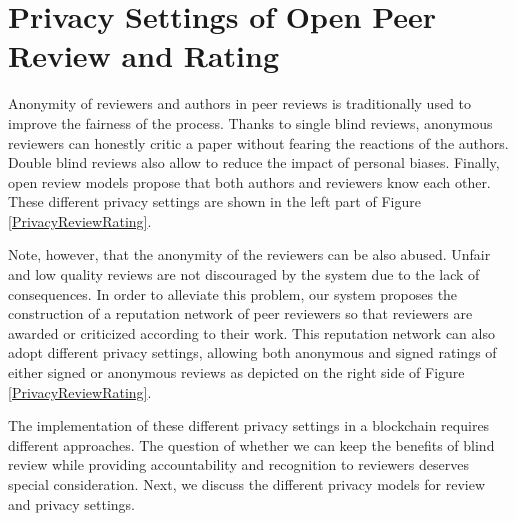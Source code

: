   \section{Privacy Settings of Open Peer Review and Rating}
  \label{privacy}
  Anonymity of reviewers and authors in peer reviews is traditionally used to
  improve the fairness of the process. Thanks to single blind reviews, anonymous
  reviewers can honestly critic a paper without fearing the reactions of the
  authors. Double blind reviews also allow to reduce the impact of personal
  biases. Finally, open review models propose that both authors and reviewers
  know each other. These different privacy settings are shown in the left part
  of Figure \ref{PrivacyReviewRating}.


Note, however, that the anonymity of the reviewers can be also abused. Unfair
and low quality reviews are not discouraged by the system due to the lack of
consequences. In order to alleviate this problem, our system proposes the
construction of a reputation network of peer reviewers so that reviewers are
awarded or criticized according to their work. This reputation network can also
adopt different privacy settings, allowing both anonymous and signed ratings of
either signed or anonymous reviews as depicted on the right side of Figure
\ref{PrivacyReviewRating}.

The implementation of these different privacy settings in a blockchain requires
different approaches. The question of whether we can keep the benefits of blind
review while providing accountability and recognition to reviewers deserves
special consideration. Next, we discuss the different privacy models for review
and privacy settings.



